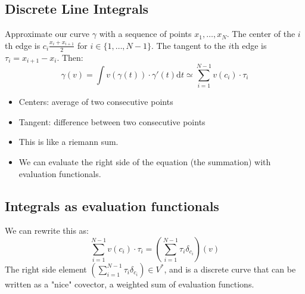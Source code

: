 \documentclass[10pt]{article}
\begin{document}
\subsection*{Discrete Line Integrals}
Approximate our curve $\gamma$ with a sequence of points $x_1, \dots, x_N$.  The center of the $i$th edge is $c_i \frac{x_i + x_{i + 1}}{2}$ for $i \in \{1, \dots, N - 1\}$.  The tangent to the $i$th edge is $\tau_i = x_{i + 1} - x_i$.  Then:
\[\gamma(v) = \int v(\gamma(t)) \cdot \gamma'(t) \text{d}t \simeq \sum_{i=1}^{N-1} v(c_i)\cdot \tau_i\]
\begin{itemize}
    \item Centers: average of two consecutive points
    \item Tangent: difference between two consecutive points
    \item This is like a riemann sum.
    \item We can evaluate the right side of the equation (the summation) with evaluation functionals.
\end{itemize}

\subsection*{Integrals as evaluation functionals}
We can rewrite this as:
\[\sum_{i = 1}^{N - 1} v(c_i) \cdot \tau_i = \left(\sum_{i = 1}^{N - 1} \tau_i \delta_{c_i}\right)(v)\]
The right side element $\left(\sum_{i = 1}^{N - 1} \tau_i \delta_{c_i}\right) \in V^*$, and is a discrete curve that can be written as a "nice" covector, a weighted sum of evaluation functions. 
\end{document}
